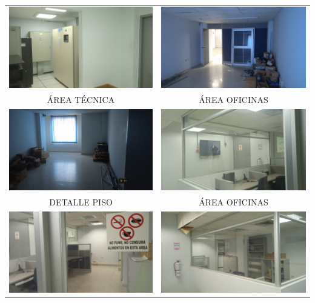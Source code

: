 \documentclass[12pt,a4paper,twoside]{article}
\begin{document}
{\begin{tabular}{ c c }
	\includegraphics[width = 7 cm]{Imagenes/25} & \includegraphics[width = 7 cm]{Imagenes/26} \\
	ÁREA TÉCNICA & ÁREA OFICINAS\\
	\includegraphics[width = 7 cm]{Imagenes/27} & \includegraphics[width = 7 cm]{Imagenes/28} \\
	DETALLE PISO & ÁREA OFICINAS\\
		\includegraphics[width = 7 cm]{Imagenes/29} & \includegraphics[width = 7 cm]{Imagenes/30} \\

\end{tabular}}
\end{document}
